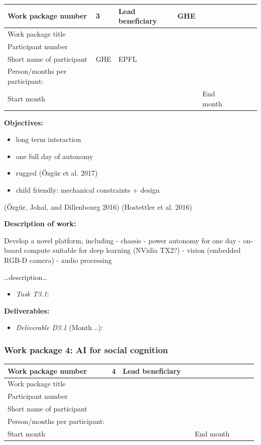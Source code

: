 \documentclass[]{article}
\providecommand{\tightlist}{%
  \setlength{\itemsep}{0pt}\setlength{\parskip}{0pt}}
\begin{document}
\begin{longtable}[]{@{}llllllll@{}}
\toprule
Work package number & 3 & Lead beneficiary & GHE & & & &\tabularnewline
\midrule
\endhead
Work package title & & & & & & &\tabularnewline
Participant number & & & & & & &\tabularnewline
Short name of participant & GHE & EPFL & & & & &\tabularnewline
Person/months per participant: & & & & & & &\tabularnewline
Start month & & & & End month & & &\tabularnewline
\bottomrule
\end{longtable}

\textbf{Objectives:}

\begin{itemize}
\tightlist
\item
  long term interaction
\item
  one full day of autonomy
\item
  rugged (Özgür et al. 2017)
\item
  child friendly: mechanical constraints + design
\end{itemize}

(Özgür, Johal, and Dillenbourg 2016) (Hostettler et al. 2016)

\textbf{Description of work:}

Develop a novel platform, including - chassis - power autonomy for one
day - on-board compute suitable for deep learning (NVidia TX2?) - vision
(embedded RGB-D camera) - audio processing

\ldots{}description\ldots{}

\begin{itemize}
\tightlist
\item
  \emph{Task T3.1}:
\end{itemize}

\textbf{Deliverables:}

\begin{itemize}
\tightlist
\item
  \emph{Deliverable D3.1} (Month ..):
\end{itemize}

\hypertarget{work-package-4-ai-for-social-cognition}{%
\subsubsection{Work package 4: AI for social
cognition}\label{work-package-4-ai-for-social-cognition}}

\begin{longtable}[]{@{}llllllll@{}}
\toprule
Work package number & 4 & Lead beneficiary & & & & &\tabularnewline
\midrule
\endhead
Work package title & & & & & & &\tabularnewline
Participant number & & & & & & &\tabularnewline
Short name of participant & & & & & & &\tabularnewline
Person/months per participant: & & & & & & &\tabularnewline
Start month & & & & End month & & &\tabularnewline
\bottomrule
\end{longtable}
\end{document}
